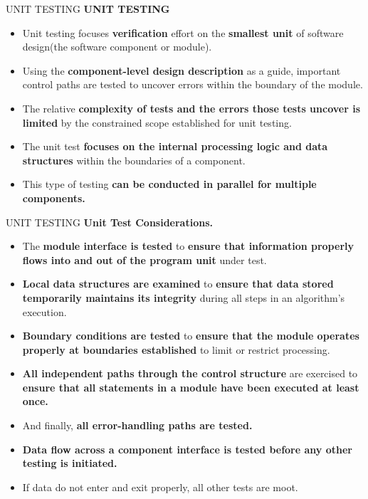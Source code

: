 \documentclass{beamer}
\begin{document}
\begin{frame}{UNIT TESTING}
\textbf{UNIT TESTING}
\begin{itemize}
	\item Unit testing focuses \textbf{verification} effort on the \textbf{smallest unit} of software design(the software component or module). 
	\item Using the \textbf{component-level design description} as a guide, important control paths are tested to uncover errors within the boundary of the module. 
	\item The relative \textbf{complexity of tests and the errors those tests uncover is limited} by the constrained scope established for unit testing. 
	\item The unit test\textbf{ focuses on the internal processing logic and data structures} within the boundaries of a component. 
	\item This type of testing \textbf{can be conducted in parallel for multiple components.}
	
\end{itemize}
\end{frame}
\begin{frame}{UNIT TESTING}
	\textbf{Unit Test Considerations.}
	\begin{itemize}
		\item The \textbf{module interface is tested} to \textbf{ensure that information properly flows into and out of the program unit} under test. 
		\item \textbf{Local data structures are examined} to\textbf{ ensure that data stored temporarily maintains its integrity }during all steps in an algorithm’s execution. 
		\item \textbf{Boundary conditions are tested} to \textbf{ensure that the module operates properly at boundaries established} to limit or restrict processing. 
		\item \textbf{All independent paths through the control structure} are exercised to \textbf{ensure that all statements in a module have been executed at least once. }
		\item And finally, \textbf{all error-handling paths are tested.}
		\item \textbf{Data flow across a component interface is tested before any other testing is initiated.}
		\item If data do not enter and exit properly, all other tests are moot. 
		
	\end{itemize}
\end{frame}
\end{document}
